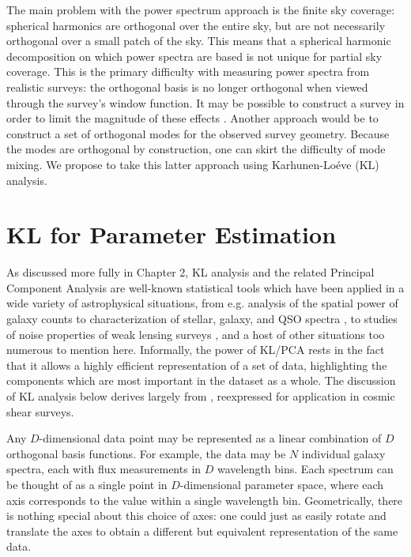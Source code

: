 The main problem with the power spectrum approach is the finite sky coverage:
spherical harmonics are orthogonal over the entire sky, but are not
necessarily orthogonal over a small patch of the sky.  This means that a
spherical harmonic decomposition on which power spectra are based is not
unique for partial sky coverage.  This is the primary difficulty with
measuring power spectra from realistic surveys: the orthogonal basis is no
longer orthogonal when viewed through the survey's window function.
It may be possible to construct a survey in order to
limit the magnitude of these effects
\citep[see][for some approaches]{Kilbinger04, Kilbinger06}.
Another approach would be to construct a set of orthogonal modes for the
observed survey geometry.  Because the modes are orthogonal by construction,
one can skirt the difficulty of mode mixing.  We propose to take this latter
approach using Karhunen-Lo\'{e}ve (KL) analysis.

\section{KL for Parameter Estimation}
\label{sec:kl_intro}
As discussed more fully in Chapter 2,
KL analysis and the related Principal Component Analysis are well-known
statistical tools which have been applied in a wide variety of astrophysical
situations, from e.g. analysis of the spatial power of galaxy counts
\citep{Vogeley96, Szalay03, Pope04}
to characterization of stellar, galaxy, and QSO spectra
\citep{Connolly95, Connolly99, Yip04a, Yip04b},
to studies of noise properties of weak lensing surveys
\citep{Kilbinger06, Munshi06}, and a host of other situations too numerous
to mention here.  Informally, the power of KL/PCA rests in the fact that 
it allows a highly efficient representation of a set of data, highlighting
the components which are most important in the dataset as a whole.
The discussion of KL analysis below derives largely from \citet{Vogeley96},
reexpressed for application in cosmic shear surveys.

Any $D$-dimensional data point may be represented as a linear combination of 
$D$ orthogonal basis functions.  
For example, the data may be $N$ individual galaxy spectra, each with flux
measurements in $D$ wavelength bins.  Each spectrum can be thought of as a
single point in $D$-dimensional parameter space, where each axis corresponds
to the value within a single wavelength bin.  
Geometrically, there is nothing special about
this choice of axes: one could just as easily rotate and translate the axes
to obtain a different but equivalent representation of the same data.


